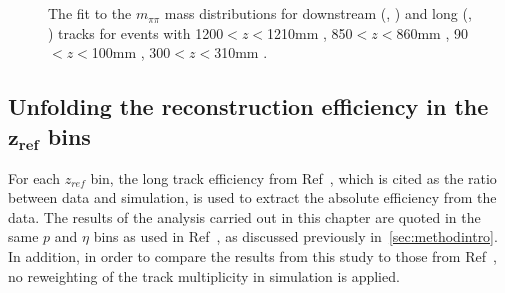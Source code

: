 \begin{figure}
\begin{center}
 
    \\
    \\
  
\end{center}
\caption{The fit to the $m_{\pi\pi}$ mass distributions for downstream (\protect{}, \protect{}) and long (\protect{}, \protect{}) tracks for events with 1200$<z<$1210\:mm \protect{}, 850$<z<$860\:mm \protect{}, 90$<z<$100\:mm \protect{}, 300$<z<$310\:mm \protect{}. %
  \label{fig:mass}}
\end{figure}

  

\FloatBarrier






\subsection[Unfolding the reconstruction efficiency in the $z_{ref}$ bins]{Unfolding the reconstruction efficiency in the $\mathbold{z_{ref}}$ bins}
For each $z_{ref}$ bin, the long track efficiency from Ref~\cite{LHCB-DP-2013-002}, which is cited as the ratio between data and simulation, is used to extract the absolute efficiency from the data. The results of the analysis carried out in this chapter are quoted in the same $p$ and $\eta$ bins as used in Ref~\cite{LHCB-DP-2013-002}, as discussed previously in~\autoref{sec:methodintro}. In addition, in order to compare the results from this study to those from Ref~\cite{DDpat}, no reweighting of the track multiplicity in simulation is applied.

